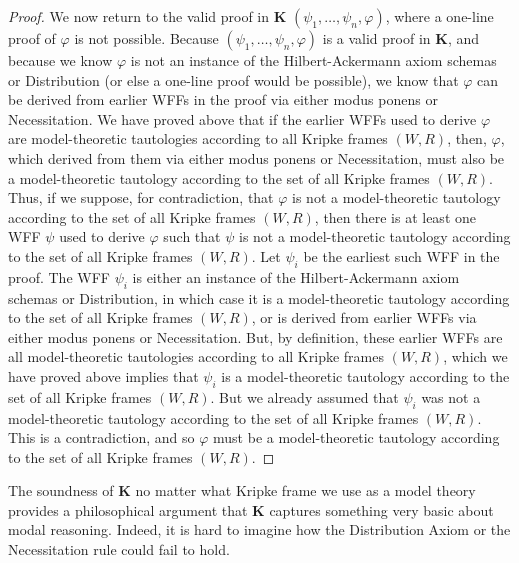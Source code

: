 \documentclass[11pt]{article}
\theoremstyle{definition}
\theoremstyle{remark}
\begin{document}
\begin{proof}
    We now return to the valid proof in \textbf{K} $(\psi_{1},\dots,\psi_{n},\varphi)$, where a one-line proof of $\varphi$ is not possible. Because $(\psi_{1},\dots,\psi_{n},\varphi)$ is a valid proof in \textbf{K}, and because we know $\varphi$ is not an instance of the Hilbert-Ackermann axiom schemas or Distribution (or else a one-line proof would be possible), we know that $\varphi$ can be derived from earlier WFFs in the proof via either modus ponens or Necessitation. We have proved above that if the earlier WFFs used to derive $\varphi$ are model-theoretic tautologies according to all Kripke frames $(W,R)$, then, $\varphi$, which derived from them via either modus ponens or Necessitation, must also be a model-theoretic tautology according to the set of all Kripke frames $(W,R)$. Thus, if we suppose, for contradiction, that $\varphi$ is not a model-theoretic tautology according to the set of all Kripke frames $(W,R)$, then there is at least one WFF $\psi$ used to derive $\varphi$ such that $\psi$ is not a model-theoretic tautology according to the set of all Kripke frames $(W,R)$. Let $\psi_{i}$ be the earliest such WFF in the proof. The WFF $\psi_{i}$ is either an instance of the Hilbert-Ackermann axiom schemas or Distribution, in which case it is a model-theoretic tautology according to the set of all Kripke frames $(W,R)$, or is derived from earlier WFFs via either modus ponens or Necessitation. But, by definition, these earlier WFFs are all model-theoretic tautologies according to all Kripke frames $(W,R)$, which we have proved above implies that $\psi_{i}$ is a model-theoretic tautology according to the set of all Kripke frames $(W,R)$. But we already assumed that $\psi_{i}$ was not a model-theoretic tautology according to the set of all Kripke frames $(W,R)$. This is a contradiction, and so $\varphi$ must be a model-theoretic tautology according to the set of all Kripke frames $(W,R)$.
\end{proof}
\noindent
The soundness of \textbf{K} no matter what Kripke frame we use as a model theory provides a philosophical argument that \textbf{K} captures something very basic about modal reasoning. Indeed, it is hard to imagine how the Distribution Axiom or the Necessitation rule could fail to hold.\par
\end{document}
